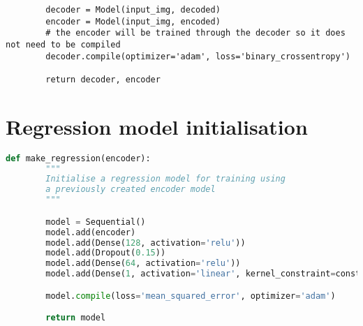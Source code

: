 \documentclass{l4proj}
\begin{document}
\begin{appendices}
\begin{lstlisting}
        decoder = Model(input_img, decoded)
        encoder = Model(input_img, encoded)
        # the encoder will be trained through the decoder so it does not need to be compiled
        decoder.compile(optimizer='adam', loss='binary_crossentropy')

        return decoder, encoder
\end{lstlisting}

\section{Regression model initialisation}

\begin{lstlisting}[language=python, caption={Keras code for initialising the regression model developed here. It is constructed from an encoder model which has been previously initialised.}, label=lst:regression]
    def make_regression(encoder):
        """
        Initialise a regression model for training using
        a previously created encoder model
        """

        model = Sequential()
        model.add(encoder)
        model.add(Dense(128, activation='relu'))
        model.add(Dropout(0.15))
        model.add(Dense(64, activation='relu'))
        model.add(Dense(1, activation='linear', kernel_constraint=constraints.NonNeg()))

        model.compile(loss='mean_squared_error', optimizer='adam')

        return model
\end{lstlisting}

\end{appendices}






\end{document}

